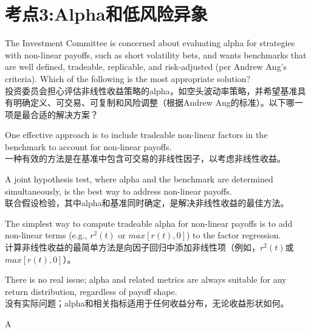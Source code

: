 \documentclass{article}
\newcounter{question} %
\begin{document}
\newpage


\section{考点3:Alpha和低风险异象}
\setcounter{question}{0}


\begin{question}
    The Investment Committee is concerned about evaluating alpha for strategies with non-linear payoffs, such as short volatility bets, and wants benchmarks that are well defined, tradeable, replicable, and risk-adjusted (per Andrew Ang's criteria). Which of the following is the most appropriate solution?\\
    投资委员会担心评估非线性收益策略的alpha，如空头波动率策略，并希望基准具有明确定义、可交易、可复制和风险调整（根据Andrew Ang的标准）。以下哪一项是最合适的解决方案？
\end{question}

\begin{choices}
    \item One effective approach is to include tradeable non-linear factors in the benchmark to account for non-linear payoffs.\\
    一种有效的方法是在基准中包含可交易的非线性因子，以考虑非线性收益。
    \item A joint hypothesis test, where alpha and the benchmark are determined simultaneously, is the best way to address non-linear payoffs.\\
    联合假设检验，其中alpha和基准同时确定，是解决非线性收益的最佳方法。
    \item The simplest way to compute tradeable alpha for non-linear payoffs is to add non-linear terms (e.g., $r^2(t)$ or $max[r(t),0]$) to the factor regression.\\
    计算非线性收益的最简单方法是向因子回归中添加非线性项（例如，$r^2(t)$或$max[r(t),0]$）。
    \item There is no real issue; alpha and related metrics are always suitable for any return distribution, regardless of payoff shape.\\
    没有实际问题；alpha和相关指标适用于任何收益分布，无论收益形状如何。
\end{choices}

\begin{correctanswer}
    A
\end{correctanswer}
\end{document}
